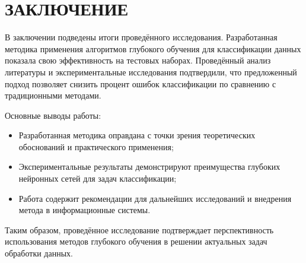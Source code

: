 \chapter*{ЗАКЛЮЧЕНИЕ}

В заключении подведены итоги проведённого исследования. Разработанная методика применения алгоритмов глубокого обучения для классификации данных показала свою эффективность на тестовых наборах. Проведённый анализ литературы и экспериментальные исследования подтвердили, что предложенный подход позволяет снизить процент ошибок классификации по сравнению с традиционными методами.

Основные выводы работы:
\begin{itemize}
  \item Разработанная методика оправдана с точки зрения теоретических обоснований и практического применения;
  \item Экспериментальные результаты демонстрируют преимущества глубоких нейронных сетей для задач классификации;
  \item Работа содержит рекомендации для дальнейших исследований и внедрения метода в информационные системы.
\end{itemize}

Таким образом, проведённое исследование подтверждает перспективность использования методов глубокого обучения в решении актуальных задач обработки данных.
